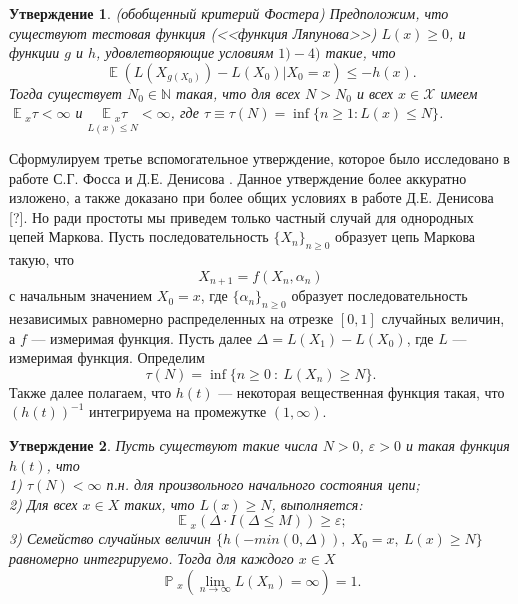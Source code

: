 \documentclass[10pt, reqno]{amsart}
\newtheorem{numbered_theorem}{Утверждение}
\DeclareMathOperator*{\E}{\mathbb{E}}
\DeclareMathOperator*{\Pb}{\mathbb{P}}
\begin{document}
\begin{numbered_theorem}
(обобщенный критерий Фостера)
Предположим, что существуют тестовая функция (<<функция Ляпунова>>) $L(x) \geq 0$, и функции $g$ и $h$, удовлетворяющие условиям $1)-4)$ такие, что
\begin{equation}
    \E(L(X_{g(X_{0})}) − L(X_{0}) | X_{0}=x) \leq -h(x).
    \label{foster_property_2_app}
\end{equation}
Тогда существует $N_{0} \in \mathbb{N}$ такая, что для всех $N > N_{0}$ и всех $x \in \mathcal{X}$ имеем $\E{}_{x}\tau < \infty$ и $\underset{L(x) \leq N}{\E{}_{x}\tau} < \infty$, где $\tau \equiv \tau(N) = \inf\{n \geq 1 : L(x) \leq N\}$.
\end{numbered_theorem} 

${}$\\ Сформулируем третье вспомогательное утверждение, которое было исследовано в работе С.Г. Фосса и Д.Е. Денисова \cite{Foss_theorem_for_instability}. Данное утверждение более аккуратно изложено, а также доказано при более общих условиях в работе Д.Е. Денисова [?]. Но ради простоты мы приведем только частный случай для однородных цепей Маркова. Пусть последовательность $\{X_{n}\}_{n \geq 0}$ образует цепь Маркова такую, что
\begin{equation*}
    X_{n+1} = f(X_{n}, \alpha_{n})
\end{equation*}
с начальным значением $X_{0} = x$, где $\{\alpha_{n}\}_{n \geq 0}$ образует последовательность независимых равномерно распределенных на отрезке $[0, 1]$ случайных величин, а $f$ --- измеримая функция. Пусть далее $\Delta = L(X_{1}) - L(X_{0})$, где $L$ --- измеримая функция. Определим
\begin{equation*}
    \tau(N) = \inf\{n \geq 0\: : \: L(X_{n}) \geq N \}.
\end{equation*}
Также далее полагаем, что $h(t)$ --- некоторая вещественная функция такая, что $(h(t))^{-1}$ интегрируема на промежутке $(1, \infty)$.\\
\begin{numbered_theorem}
Пусть существуют такие числа $N > 0$, $\varepsilon > 0$ и такая функция $h(t)$, что\\
1) $\tau(N) < \infty$ п.н. для произвольного начального состояния цепи;\\ 
2) Для всех $x \in X$ таких, что $L(x) \geq N$, выполняется:
\begin{equation*}
    \E{}_{x}(\Delta \cdot I(\Delta \leq M)) \geq \varepsilon;
\end{equation*}
3) Семейство случайных величин $\{h(-min(0, \Delta)),\: X_{0}=x, \:L(x) \geq N\}$ равномерно интегрируемо. Тогда для каждого $x \in X$ \\
\begin{equation*}
    \Pb{}_{x}(\lim_{n\to\infty}L(X_{n}) = \infty) = 1.
\end{equation*}
\end{numbered_theorem}
\end{document}
